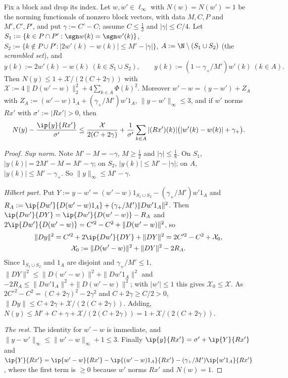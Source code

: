 \begin{lemma}[Anchor]\label{lem:anchor}
Fix a block and drop its index.  Let $w,w'\in\ell_\infty$ with
$N(w)=N(w')=1$ be the norming functionals of nonzero block vectors, with
data $M,C,P$ and $M',C',P'$, and put $\gamma:=C'-C$; assume $C\le\frac12$
and $|\gamma|\le C/4$.  Let $S_1:=\{k\in P\cap P':\sgn w(k)=\sgn w'(k)\}$,
$S_2:=\{k\notin P\cup P':|2w'(k)-w(k)|\le M'-|\gamma|\}$,
$A:=\N\setminus(S_1\cup S_2)$ \textup{(}the \emph{scrambled set}\textup{)},
and
\[
 y(k):=2w'(k)-w(k)\ (k\in S_1\cup S_2),\qquad
 y(k):=(1-\gamma_+/M')w'(k)\ (k\in A).
\]
Then $N(y)\le1+\mathcal X/(2(C+2\gamma))$ with
$\mathcal X:=4\|D(w'-w)\|_2^2+4\sum_{k\in A}\Phi(k)^2$.  Moreover
$w'-w=(y-w')+Z_A$ with $Z_A:=(w'-w)1_A+(\gamma_+/M')w'1_A$,
$\|y-w'\|_\infty\le3$, and if $w'$ norms $R x'$ with $\sigma':=|Rx'|>0$,
then
\[
 N(y)-\frac{\ip{y}{Rx'}}{\sigma'}\le\frac{\mathcal X}{2(C+2\gamma)}+
 \frac1{\sigma'}\sum_{k\in A}|(Rx')(k)|\big(|w'(k)-w(k)|+\gamma_+\big).
\]
\end{lemma}

\begin{proof}
\emph{Sup norm.}  Note $M'-M=-\gamma$, $M\ge\frac12$ and $|\gamma|\le\frac18$.
On $S_1$, $|y(k)|=2M'-M=M'-\gamma$; on $S_2$, $|y(k)|\le M'-|\gamma|$; on
$A$, $|y(k)|\le M'-\gamma_+$.  So $\|y\|_\infty\le M'-\gamma$.

\emph{Hilbert part.}  Put $Y:=y-w'=(w'-w)1_{S_1\cup S_2}-(\gamma_+/M')w'1_A$
and $R_A:=\ip{Dw'}{D(w'-w)1_A}+(\gamma_+/M')\|Dw'1_A\|^2$.  Then
$\ip{Dw'}{DY}=\ip{Dw'}{D(w'-w)}-R_A$ and $2\ip{Dw'}{D(w'-w)}=C'^2-C^2+
\|D(w'-w)\|^2$, so
\begin{gather*}
 \|Dy\|^2=C'^2+2\ip{Dw'}{DY}+\|DY\|^2=2C'^2-C^2+\mathcal X_0,\\
 \mathcal X_0:=\|D(w'-w)\|^2+\|DY\|^2-2R_A .
\end{gather*}
Since $1_{S_1\cup S_2}$ and $1_A$ are disjoint and $\gamma_+/M'\le1$,
$\|DY\|^2\le\|D(w'-w)\|^2+\|Dw'1_A\|^2$ and $-2R_A\le\|Dw'1_A\|^2+
\|D(w'-w)\|^2$; with $|w'|\le1$ this gives $\mathcal X_0\le\mathcal X$.  As
$2C'^2-C^2=(C+2\gamma)^2-2\gamma^2$ and $C+2\gamma\ge C/2>0$,
$\|Dy\|\le C+2\gamma+\mathcal X/(2(C+2\gamma))$.  Adding,
$N(y)\le M'+C+\gamma+\mathcal X/(2(C+2\gamma))=1+\mathcal X/(2(C+2\gamma))$.

\emph{The rest.}  The identity for $w'-w$ is immediate, and
$\|y-w'\|_\infty\le\|w'-w\|_\infty+1\le3$.  Finally $\ip{y}{Rx'}=\sigma'+
\ip{Y}{Rx'}$ and $\ip{Y}{Rx'}=\ip{w'-w}{Rx'}-\ip{(w'-w)1_A}{Rx'}-
(\gamma_+/M')\ip{w'1_A}{Rx'}$, where the first term is $\ge0$ because $w'$
norms $Rx'$ and $N(w)=1$.
\end{proof}

